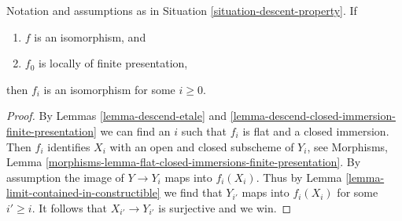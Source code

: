 \begin{lemma}
\label{lemma-descend-isomorphism}
Notation and assumptions as in Situation \ref{situation-descent-property}.
If
\begin{enumerate}
\item $f$ is an isomorphism, and
\item $f_0$ is locally of finite presentation,
\end{enumerate}
then $f_i$ is an isomorphism for some $i \geq 0$.
\end{lemma}

\begin{proof}
By Lemmas \ref{lemma-descend-etale} and
\ref{lemma-descend-closed-immersion-finite-presentation}
we can find an $i$ such that $f_i$ is flat and a closed immersion.
Then $f_i$ identifies $X_i$ with an open and closed subscheme of
$Y_i$, see Morphisms, Lemma
\ref{morphisms-lemma-flat-closed-immersions-finite-presentation}.
By assumption the image of $Y \to Y_i$ maps into $f_i(X_i)$.
Thus by Lemma \ref{lemma-limit-contained-in-constructible}
we find that $Y_{i'}$ maps into $f_i(X_i)$ for some $i' \geq i$.
It follows that $X_{i'} \to Y_{i'}$ is surjective and we win.
\end{proof}
